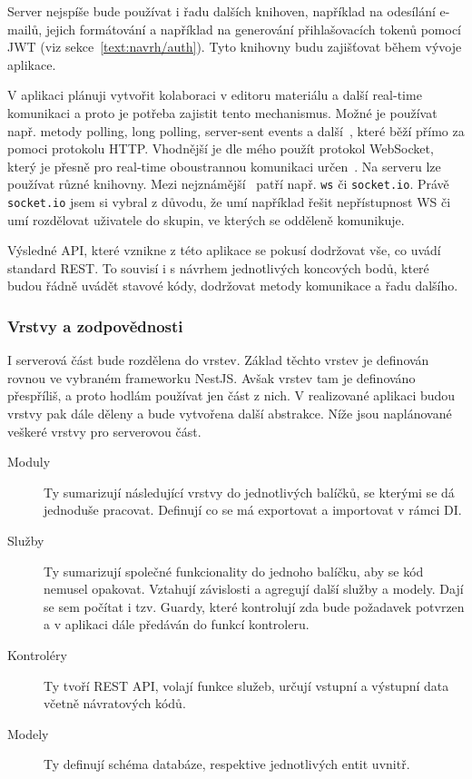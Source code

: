 Server nejspíše bude používat i řadu dalších knihoven, například na odesílání e-mailů, jejich formátování a například na generování přihlašovacích tokenů pomocí JWT (viz sekce~\ref{text:navrh/auth}).
Tyto knihovny budu zajišťovat během vývoje aplikace.

V aplikaci plánuji vytvořit kolaboraci v editoru materiálu a další real-time komunikaci a proto je potřeba zajistit tento mechanismus.
Možné je používat např. metody polling, long polling, server-sent events a další~\cite{subramanian_2021}, které běží přímo za pomoci protokolu HTTP.
Vhodnější je dle mého použít protokol WebSocket, který je přesně pro real-time oboustrannou komunikaci určen~\cite{rfc6455}.
Na serveru lze používat různé knihovny.
Mezi nejznámější~\cite{uzayr2022frontend} patří např. \verb|ws| či \verb|socket.io|.
Právě \verb|socket.io| jsem si vybral z důvodu, že umí například řešit nepřístupnost WS či umí rozdělovat uživatele do skupin, ve kterých se odděleně komunikuje.

Výsledné API, které vznikne z této aplikace se pokusí dodržovat vše, co uvádí standard REST.
To souvisí i s návrhem jednotlivých koncových bodů, které budou řádně uvádět stavové kódy, dodržovat metody komunikace a řadu dalšího.

\subsubsection{Vrstvy a zodpovědnosti}

I serverová část bude rozdělena do vrstev. 
Základ těchto vrstev je definován rovnou ve vybraném frameworku NestJS.
Avšak vrstev tam je definováno přespříliš, a proto hodlám používat jen část z nich.
V realizované aplikaci budou vrstvy pak dále děleny a bude vytvořena další abstrakce.
Níže jsou naplánované veškeré vrstvy pro serverovou část.

\begin{description}
    \item[Moduly] Ty sumarizují následující vrstvy do jednotlivých balíčků, se kterými se dá jednoduše pracovat. Definují co se má exportovat a importovat v rámci DI.
    \item[Služby] Ty sumarizují společné funkcionality do jednoho balíčku, aby se kód nemusel opakovat. Vztahují závislosti a agregují další služby a modely. Dají se sem počítat i tzv. Guardy, které kontrolují zda bude požadavek potvrzen a v aplikaci dále předáván do funkcí kontroleru.
    \item[Kontroléry] Ty tvoří REST API, volají funkce služeb, určují vstupní a výstupní data včetně návratových kódů.
    \item[Modely] Ty definují schéma databáze, respektive jednotlivých entit uvnitř.
\end{description}


